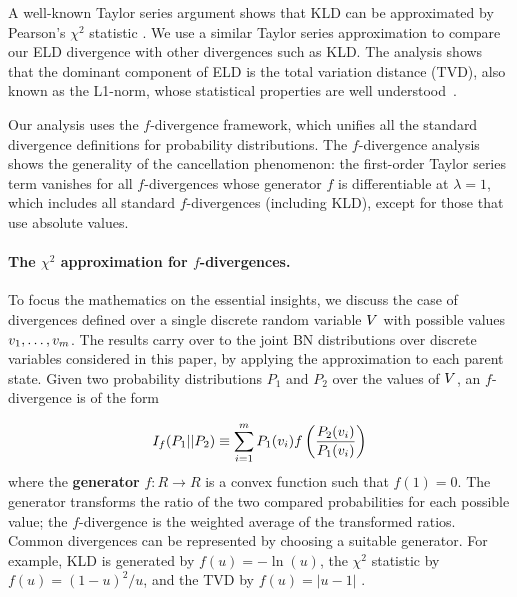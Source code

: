 {A well-known Taylor series argument shows that KLD can be approximated by Pearson's $\chi^{2}$ statistic \citep{Nielsen2014}. We use a similar Taylor series approximation to compare our ELD divergence with other divergences such as KLD. The analysis shows that the dominant component of ELD is the total variation distance (TVD), also known as the L1-norm, whose statistical properties are well understood~\citep{Beirlant2001,Beirlant1994}. 

Our analysis uses the $f$-divergence framework, which unifies all the standard divergence definitions for probability distributions. The $f$-divergence analysis shows the generality of the cancellation phenomenon: the first-order Taylor series term vanishes for all $f$-divergences whose generator $f$ is differentiable at $\lambda = 1$, which includes all standard $f$-divergences (including KLD), except for those that use absolute values. 

\paragraph{The $\chi^2$ approximation for $f$-divergences.}
To focus the mathematics on the essential insights, we discuss the case of divergences defined over a single discrete random variable $V$ with possible values $v_{1},\ldots,v_{m}$. The results carry over to the joint BN distributions over discrete variables considered in this paper, by applying the approximation to each parent state. Given two probability distributions $P_{1}$ and $P_{2}$ over the values of $V$, an $f$-divergence is of the form 

\begin{equation}
\label{eq:f-divergence}
I_{f}(P_{1}||P_{2}) \equiv \sum_{i=1}^{m} P_{1}(v_{i}) f\left(\frac{P_{2}(v_{i})}{P_{1}(v_{i})}\right)
\end{equation}
%
where the \textbf{generator} $f:R \rightarrow R$ is a convex function such that $f(1)=0$. 
The generator transforms the ratio of the two compared probabilities for each possible value; the $f$-divergence is the weighted average of the transformed ratios. Common divergences can be represented by choosing a suitable generator. For example, KLD is generated by $f(u) = -\ln(u)$, the $\chi^{2}$ statistic by $f(u) = (1-u)^{2}/u$, and the TVD by $f(u) = |u-1|$ \citep{Nielsen2014}. 

}
